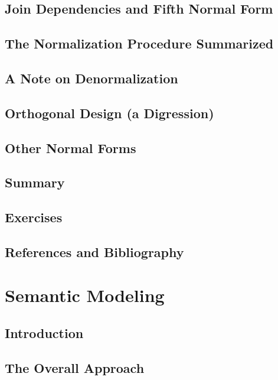 \documentclass{book}
\begin{document}
\section{Join Dependencies and Fifth Normal Form}

\section{The Normalization Procedure Summarized}

\section{A Note on Denormalization}

\section{Orthogonal Design (a Digression)}

\section{Other Normal Forms}

\section{Summary}

\section{Exercises}

\section{References and Bibliography}











\chapter{Semantic Modeling}

\section{Introduction}

\section{The Overall Approach}
\end{document}
